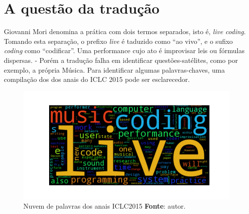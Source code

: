\section{A questão da tradução}\label{sec:traducao}

Giovanni Mori denomina a prática com dois termos separados, isto é, \emph{live coding}. Tomando esta separação, o prefixo \emph{live} é taduzido como ``ao vivo'', e o sufixo \emph{coding} como ``codificar''. Uma performance cujo ato é improvisar leis ou fórmulas dispersas.
-
Porém a tradução falha em identificar questões-satélites, como por exemplo, a própria Música. Para identificar algumas palavras-chaves, uma compilação dos dos anais do ICLC 2015 \cite{ICLC2015} pode ser esclarecedor.


\begin{figure}[!h]
\begin{center}
\centering
\includegraphics[scale=0.71]{./imagens/livecoding_cloud1.png}
\caption{Nuvem de palavras dos anais ICLC2015 \textbf{Fonte}: autor.}
\label{fig:nuvemlivecoding}
\end{center}
\end{figure}

